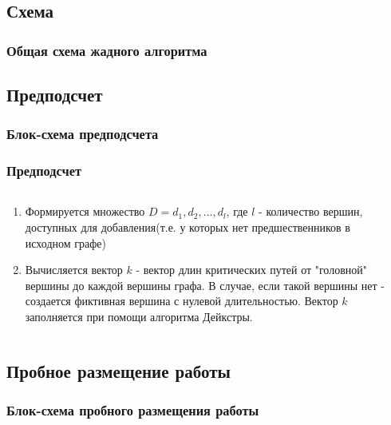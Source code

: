 \documentclass[hyperref=unicode, aspectratio=169]{beamer}
\begin{document}
\subsection{Схема}
\begin{frame}
    \frametitle{Общая схема жадного алгоритма}
    {\tiny
    }
\end{frame}

\subsection{Предподсчет}

\begin{frame}
    \frametitle{Блок-схема предподсчета}
    {\tiny
    }
\end{frame}

\begin{frame}
    \frametitle{Предподсчет}
    \begin{columns}
        \begin{column}{0.6\textwidth}
            \begin{enumerate}
                \item Формируется множество $D=d_1, d_2, \dots, d_l$, где $l$ - количество вершин, доступных для добавления(т.е. у которых нет предшественников в исходном графе)
                \item Вычисляется вектор $k$ - вектор длин критических путей от "головной" вершины до каждой вершины графа. В случае, если такой вершины нет - создается фиктивная вершина с нулевой длительностью. Вектор $k$ заполняется при помощи алгоритма Дейкстры.
            \end{enumerate}
        \end{column}
        \begin{column}{0.4\textwidth}
        \end{column}
    \end{columns}
\end{frame}


\subsection{Пробное размещение работы}
\begin{frame}
    \frametitle{Блок-схема пробного размещения работы}
    {\tiny
    }
\end{frame}
\end{document}
